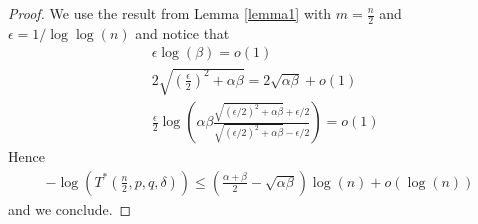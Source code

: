 \documentclass[english]{article}
\newcommand{\1}{\textbf{1}}
\begin{document}
\begin{proof}
We use the result from Lemma \ref{lemma1} with $m=\frac{n}{2}$ and $\epsilon=1/\log \log(n)$ and notice that
\begin{align*}
&\epsilon \log(\beta) = o(1)\\
&2\sqrt{ \left(\frac{\epsilon}{2} \right)^2+\alpha \beta} =2\sqrt{\alpha \beta} + o(1)\\
&\frac{\epsilon}{2} \log \left( \alpha \beta \frac{\sqrt{(\epsilon/2)^2 +\alpha \beta} +\epsilon/2}{\sqrt{(\epsilon/2)^2 +\alpha \beta} -\epsilon/2} \right) = o(1)
\end{align*}
Hence 
\begin{align*}
-\log(T^* \left( \frac{n}{2}, p,q, \delta \right)) \leq \left(\frac{\alpha +\beta}{2}-\sqrt{\alpha \beta} \right) \log(n) +o(\log(n))
\end{align*}
and we conclude.
\end{proof}
\end{document}
